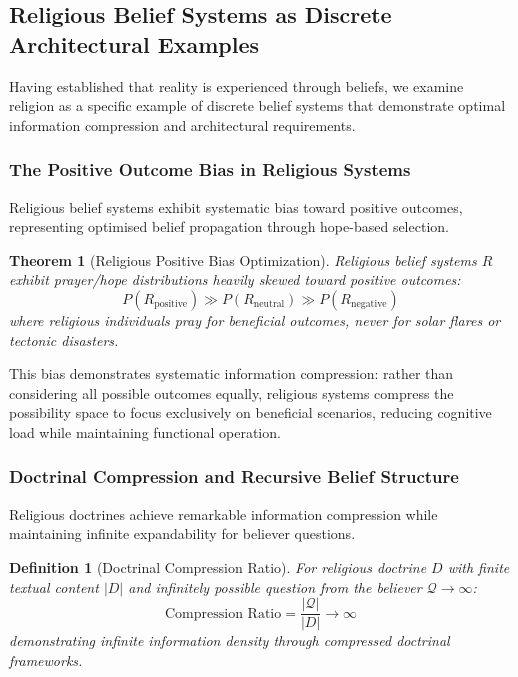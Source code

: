 \documentclass[12pt,a4paper]{article}
\newtheorem{theorem}{Theorem}
\newtheorem{definition}{Definition}
\begin{document}
\subsection{Religious Belief Systems as Discrete Architectural Examples}

Having established that reality is experienced through beliefs, we examine religion as a specific example of discrete belief systems that demonstrate optimal information compression and architectural requirements.

\subsubsection{The Positive Outcome Bias in Religious Systems}

Religious belief systems exhibit systematic bias toward positive outcomes, representing optimised belief propagation through hope-based selection.

\begin{theorem}[Religious Positive Bias Optimization]
Religious belief systems $R$ exhibit prayer/hope distributions heavily skewed toward positive outcomes:
$$P(R_{\text{positive}}) \gg P(R_{\text{neutral}}) \gg P(R_{\text{negative}})$$
where religious individuals pray for beneficial outcomes, never for solar flares or tectonic disasters.
\end{theorem}

This bias demonstrates systematic information compression: rather than considering all possible outcomes equally, religious systems compress the possibility space to focus exclusively on beneficial scenarios, reducing cognitive load while maintaining functional operation.

\subsubsection{Doctrinal Compression and Recursive Belief Structure}

Religious doctrines achieve remarkable information compression while maintaining infinite expandability for believer questions.

\begin{definition}[Doctrinal Compression Ratio]
For religious doctrine $D$ with finite textual content $|D|$ and infinitely possible question from the believer $\mathcal{Q} \to \infty$:
$$\text{Compression Ratio} = \frac{|\mathcal{Q}|}{|D|} \to \infty$$
demonstrating infinite information density through compressed doctrinal frameworks.
\end{definition}
\end{document}
